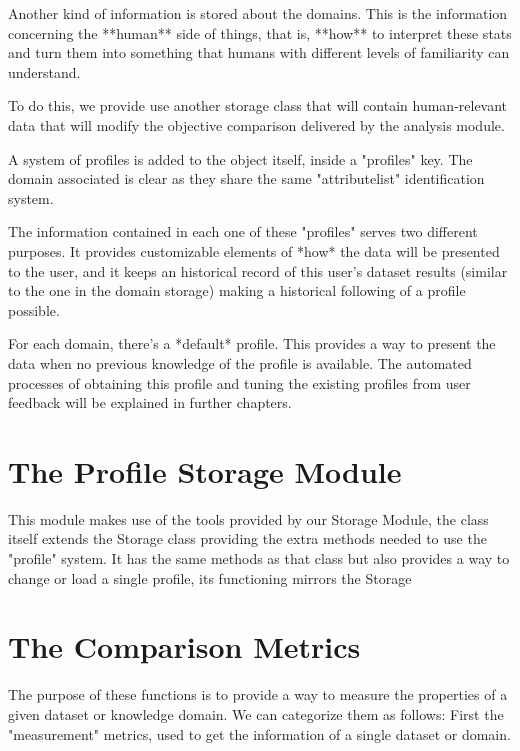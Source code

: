 Another kind of information is stored about the domains. This is the information concerning the **human** side of things, that is, **how** to interpret these stats and turn them into something that humans with different levels of familiarity can understand.

To do this, we provide use another storage class that will contain human-relevant data that will modify the objective comparison delivered by the analysis module.

A system of profiles is added to the object itself, inside a "profiles" key. The domain associated is clear as they share the same "attributelist" identification system.

The information contained in each one of these "profiles" serves two different purposes. It provides customizable elements of *how* the data will be presented to the user, and it keeps an historical record of this user's dataset results (similar to the one in the domain storage) making a historical following of a profile possible.

For each domain, there's a *default* profile. This provides a way to present the data when no previous knowledge of the profile is available. The automated processes of obtaining this profile and tuning the existing profiles from user feedback will be explained in further chapters.


\section{The Profile Storage Module}
\label{cap2:sec:profilestorage}

This module makes use of the tools provided by our Storage Module, the class itself extends the Storage class providing the extra methods needed to use the "profile" system.
It has the same methods as that class but also provides a way to change or load a single profile, its functioning mirrors the Storage

\section{The Comparison Metrics}
\label{cap2:sec:metrics}
The purpose of these functions is to provide a way to measure the properties of a given dataset or knowledge domain.
We can categorize them as follows:
First the "measurement" metrics, used to get the information of a single dataset or domain.

